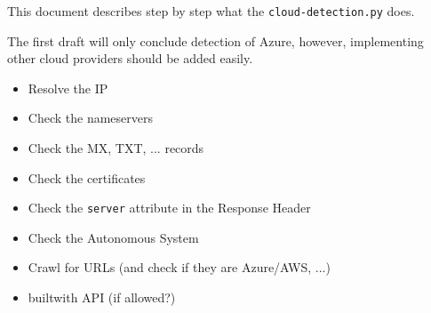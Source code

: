 \documentclass[12pt]{article}
\begin{document}
\thispagestyle{firstpage}

\begin{center}
    This document describes step by step what the \verb|cloud-detection.py| does. \\
\end{center}
The first draft will only conclude detection of Azure, however, implementing other cloud providers should be added easily.
\begin{itemize}
    \item Resolve the IP 
    \item Check the nameservers
    \item Check the MX, TXT, ... records
    \item Check the certificates
    \item Check the \verb|server| attribute in the Response Header
    \item Check the Autonomous System
    \item Crawl for URLs (and check if they are Azure/AWS, ...)
    \item builtwith API (if allowed?)
\end{itemize}
\end{document}

